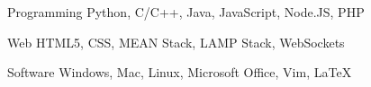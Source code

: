 


\begin{cvskills}


\cvskill
{Programming} %
{Python, C/C++, Java, JavaScript, Node.JS, PHP} %


\cvskill
{Web} %
{HTML5, CSS, MEAN Stack, LAMP Stack, WebSockets} %


\cvskill
{Software} %
{Windows, Mac, Linux, Microsoft Office, Vim, LaTeX} %


\end{cvskills}